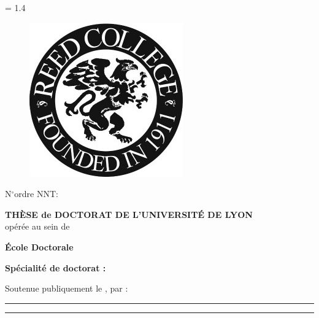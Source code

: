 \begin{titlepage}

\pagestyle{empty}
\fontsize{12}{14}\selectfont

\baselineskip = 1.4\baselineskip

  \begin{figure}
    \centering
    \includegraphics[width=0.5\linewidth]{figure/reed.jpg}
  \end{figure}
  
  {\footnotesize N\(^{\circ}\)ordre NNT: \thesisNnt}
  
  \begin{center}

    {\textbf{THÈSE de DOCTORAT DE L'UNIVERSITÉ DE LYON}} \\
    opérée au sein de \\
    \textbf{\thesisUniversity}
    
    \vspace{1em}

    \textbf{École Doctorale} \thesisEdNumber \\
    \textbf{\thesisEdName}
    
    \vspace{1em}

    \textbf{Spécialité de doctorat : \thesisUniversityDepartment}
    
    \vspace{3em}

    Soutenue publiquement le \thesisDate, par : \\
    \vspace{1em}
    {\large \textbf{\thesisAuthor}}
    
    \vspace{3em}

    \hrule
    \vspace{1.5em}
    \textbf{\LARGE \thesisTitle}
    \vspace{1.5em}
    \hrule


\end{center}
\end{titlepage}
